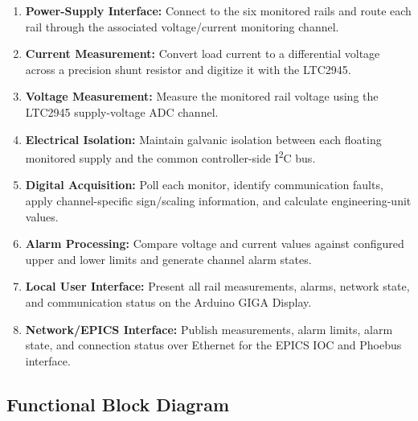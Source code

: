 \begin{enumerate}
    \item \textbf{Power-Supply Interface:} Connect to the six monitored rails and
    route each rail through the associated voltage/current monitoring channel.
    \item \textbf{Current Measurement:} Convert load current to a differential
    voltage across a precision shunt resistor and digitize it with the
    LTC2945.
    \item \textbf{Voltage Measurement:} Measure the monitored rail voltage using
    the LTC2945 supply-voltage ADC channel.
    \item \textbf{Electrical Isolation:} Maintain galvanic isolation between each
    floating monitored supply and the common controller-side I\textsuperscript{2}C bus.
    \item \textbf{Digital Acquisition:} Poll each monitor, identify communication
    faults, apply channel-specific sign/scaling information, and calculate
    engineering-unit values.
    \item \textbf{Alarm Processing:} Compare voltage and current values against
    configured upper and lower limits and generate channel alarm states.
    \item \textbf{Local User Interface:} Present all rail measurements, alarms,
    network state, and communication status on the Arduino GIGA Display.
    \item \textbf{Network/EPICS Interface:} Publish measurements, alarm limits,
    alarm state, and connection status over Ethernet for the EPICS IOC and
    Phoebus interface.
\end{enumerate}

\subsection{Functional Block Diagram}

